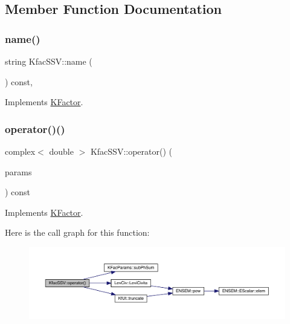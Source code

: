 \subsection{Member Function Documentation}
\mbox{\label{classKfacSSV_a72d5e577525fa97365dbcfd4c5bea88d}} 
\subsubsection{\texorpdfstring{name()}{name()}}
{\footnotesize\ttfamily string Kfac\+S\+S\+V\+::name (\begin{DoxyParamCaption}{ }\end{DoxyParamCaption}) const\hspace{0.3cm}{\ttfamily [inline]}, {\ttfamily [virtual]}}



Implements \mbox{\hyperlink{classKFactor_ae578f8d6e4b525895427717da99cab6c}{K\+Factor}}.

\mbox{\label{classKfacSSV_ad9bddcf643847eebae9926bbc646c56c}} 
\subsubsection{\texorpdfstring{operator()()}{operator()()}}
{\footnotesize\ttfamily complex$<$ double $>$ Kfac\+S\+S\+V\+::operator() (\begin{DoxyParamCaption}\item[{const \mbox{\hyperlink{classKFacParams}{K\+Fac\+Params}} \&}]{params }\end{DoxyParamCaption}) const\hspace{0.3cm}{\ttfamily [virtual]}}



Implements \mbox{\hyperlink{classKFactor_a4273897de4ef590083c7ef208b8d0f18}{K\+Factor}}.

Here is the call graph for this function\+:\nopagebreak
\begin{figure}[H]
\begin{center}
\leavevmode
\includegraphics[width=350pt]{d8/d76/classKfacSSV_ad9bddcf643847eebae9926bbc646c56c_cgraph}
\end{center}
\end{figure}


